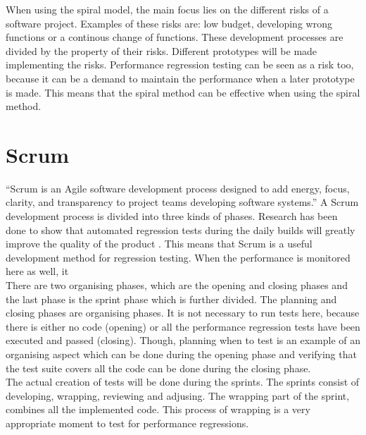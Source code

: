 When using the spiral model, the main focus lies on the different risks of a software project. Examples of these risks are: low budget, developing wrong functions or a continous change of functions. These development processes are divided by the property of their risks. Different prototypes will be made implementing the risks. Performance regression testing can be seen as a risk too, because it can be a demand to maintain the performance when a later prototype is made. This means that the spiral method can be effective when using the spiral method.

\section{Scrum}
``Scrum is an Agile software development process designed to add energy, focus, clarity, and transparency to project teams developing software systems.''\cite{sutherland2007distributed} A Scrum development process is divided into three kinds of phases. Research has been done to show that automated regression tests during the daily builds will greatly improve the quality of the product \cite{Future_of_Scrum}. This means that Scrum is a useful development method for regression testing. When the performance is monitored here as well, it  \\ There are two organising phases, which are the opening and closing phases and the last phase is the sprint phase which is further divided. The planning and closing phases are organising phases. It is not necessary to run tests here, because there is either no code (opening) or all the performance regression tests have been executed and passed (closing). Though, planning when to test is an example of an organising aspect which can be done during the opening phase and verifying that the test suite covers all the code can be done during the closing phase. \\ The actual creation of tests will be done during the sprints. The sprints consist of developing, wrapping, reviewing and adjusing. The wrapping part of the sprint, combines all the implemented code. This process of wrapping is a very appropriate moment to test for performance regressions. \\

